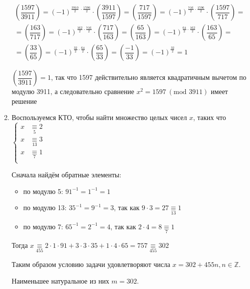 \documentclass[a4paper,12pt]{article}
\begin{document}
\begin{solution}
\begin{enumerate}
\begin{multline*}\left(\dfrac{1597}{3911}\right) = (-1)^{\frac{3910}{2}\ \cdot \frac{1596}{2}} \cdot \left(\dfrac{3911}{1597}\right) = \left(\dfrac{717}{1597}\right) = (-1)^{\frac{716}{2} \cdot \frac{1596}{2}} \cdot \left(\dfrac{1597}{717}\right) = \\ = \left(\dfrac{163}{717}\right) = (-1)^{\frac{162}{2} \cdot \frac{716}{2}} \cdot \left(\dfrac{717}{163}\right) = \left(\dfrac{65}{163}\right) = (-1)^{\frac{64}{2} \cdot \frac{162}{2}} \cdot \left(\dfrac{163}{65}\right) = \\ = \left(\dfrac{33}{65}\right) = (-1)^{\frac{32}{2} \cdot \frac{64}{2}} \cdot \left(\dfrac{65}{33}\right) = \left(\dfrac{-1}{33}\right) = (-1)^{\frac{32}{2}} = 1
\end{multline*}
	
$\left(\dfrac{1597}{3911}\right) = 1$, так что 1597 действительно является квадратичным вычетом по модулю 3911, а следовательно сравнение $x^2 = 1597 \ (\mbox{mod } 3911)$ имеет решение

\item Воспользуемся КТО, чтобы найти множество целых чисел $x$, таких что $\left\{
\begin{aligned}
x &\underset{5}{\equiv} 2 \\
x &\underset{13}{\equiv} 3\\
x &\underset{7}{\equiv} 1\\
\end{aligned}
\right.
$

Сначала найдём обратные элементы:

\begin{itemize}
	\item по модулю 5: $91^{-1} = 1^{-1} = 1$
	\item по модулю 13: $35^{-1} = 9^{-1} = 3$, так как $9 \cdot 3 = 27 \underset{13}{\equiv} 1$
	\item по модулю 7: $65^{-1} = 2^{-1} = 4$, так как $2 \cdot 4 = 8 \underset{7}{\equiv} 1$
\end{itemize}

Тогда $x  \underset{455}{\equiv} 2 \cdot 1 \cdot 91 + 3 \cdot 3 \cdot 35 + 1 \cdot 4 \cdot 65 = 757 \underset{455}{\equiv} 302$

Таким образом условию задачи удовлетворяют числа $x = 302 + 455n, n \in \mathbb{Z}$.

Наименьшее натуральное из них $m = 302$.
	
	\end{enumerate}
\end{solution}
\end{document}

